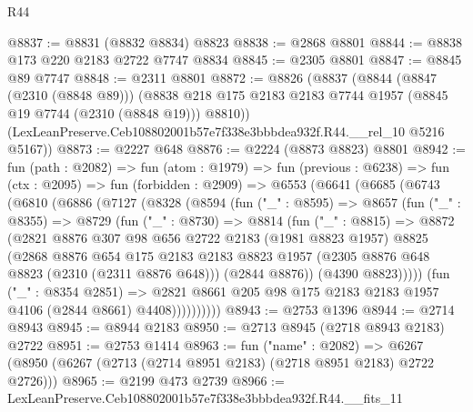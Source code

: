 \begin{lexlean}{R44}
\begin{coremodule}
@8837 := @8831 (@8832 @8834) @8823
@8838 := @2868 @8801
@8844 := @8838 @173 @220 @2183 @2722 @7747 @8834
@8845 := @2305 @8801
@8847 := @8845 @89 @7747
@8848 := @2311 @8801
@8872 := @8826
    (@8837
      (@8844
        (@8847 (@2310 (@8848 @89)))
        (@8838 @218 @175 @2183 @2183 @7744 @1957 (@8845 @19 @7744 (@2310 (@8848 @19))) @8810))
      (LexLeanPreserve.Ceb108802001b57e7f338e3bbbdea932f.R44.__rel_10 @5216 @5167))
@8873 := @2227 @648
@8876 := @2224 (@8873 @8823) @8801
@8942 := fun (path : @2082) =>
  fun (atom : @1979) =>
  fun (previous : @6238) =>
  fun (ctx : @2095) =>
  fun (forbidden : @2909) =>
  @6553
    (@6641
      (@6685
        (@6743
          (@6810
            (@6886
              (@7127
                (@8328
                  (@8594
                    (fun ("_" : @8595) =>
                    @8657
                      (fun ("_" : @8355) =>
                      @8729
                        (fun ("_" : @8730) =>
                        @8814
                          (fun ("_" : @8815) =>
                          @8872
                            (@2821
                              @8876
                              @307
                              @98
                              @656
                              @2722
                              @2183
                              (@1981 @8823 @1957)
                              @8825
                              (@2868
                                @8876
                                @654
                                @175
                                @2183
                                @2183
                                @8823
                                @1957
                                (@2305 @8876 @648 @8823 (@2310 (@2311 @8876 @648)))
                                (@2844 @8876))
                              (@4390 @8823)))))
                      (fun ("_" : @8354 @2851) =>
                      @2821
                        @8661
                        @205
                        @98
                        @175
                        @2183
                        @2183
                        @1957
                        @4106
                        (@2844 @8661)
                        @4408))))))))))
@8943 := @2753 @1396
@8944 := @2714 @8943
@8945 := @8944 @2183
@8950 := @2713 @8945 (@2718 @8943 @2183) @2722
@8951 := @2753 @1414
@8963 := fun ("name" : @2082) =>
  @6267 (@8950 (@6267 (@2713 (@2714 @8951 @2183) (@2718 @8951 @2183) @2722 @2726)))
@8965 := @2199 @473 @2739
@8966 := LexLeanPreserve.Ceb108802001b57e7f338e3bbbdea932f.R44.__fits_11

\end{coremodule}
\end{lexlean}
